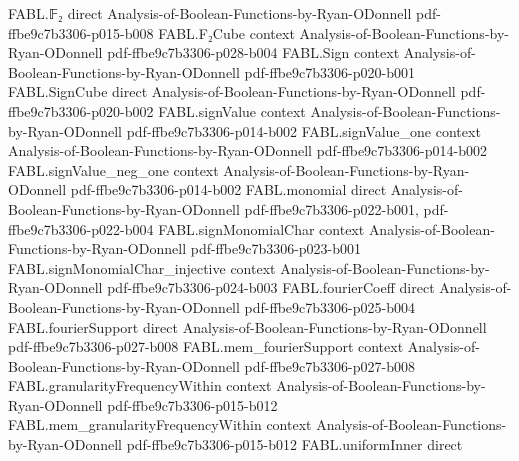 \begin{theorem}
\label{FABL.signBlrFunctionTester_complete}
\leanok
{}
\proofstep
  {FABL.𝔽₂}
  {direct}
  {Analysis-of-Boolean-Functions-by-Ryan-ODonnell}
  {pdf-ffbe9c7b3306-p015-b008}
\proofstep
  {FABL.F₂Cube}
  {context}
  {Analysis-of-Boolean-Functions-by-Ryan-ODonnell}
  {pdf-ffbe9c7b3306-p028-b004}
\proofstep
  {FABL.Sign}
  {context}
  {Analysis-of-Boolean-Functions-by-Ryan-ODonnell}
  {pdf-ffbe9c7b3306-p020-b001}
\proofstep
  {FABL.SignCube}
  {direct}
  {Analysis-of-Boolean-Functions-by-Ryan-ODonnell}
  {pdf-ffbe9c7b3306-p020-b002}
\proofstep
  {FABL.signValue}
  {context}
  {Analysis-of-Boolean-Functions-by-Ryan-ODonnell}
  {pdf-ffbe9c7b3306-p014-b002}
\proofstep
  {FABL.signValue_one}
  {context}
  {Analysis-of-Boolean-Functions-by-Ryan-ODonnell}
  {pdf-ffbe9c7b3306-p014-b002}
\proofstep
  {FABL.signValue_neg_one}
  {context}
  {Analysis-of-Boolean-Functions-by-Ryan-ODonnell}
  {pdf-ffbe9c7b3306-p014-b002}
\proofstep
  {FABL.monomial}
  {direct}
  {Analysis-of-Boolean-Functions-by-Ryan-ODonnell}
  {pdf-ffbe9c7b3306-p022-b001,
    pdf-ffbe9c7b3306-p022-b004}
\proofstep
  {FABL.signMonomialChar}
  {context}
  {Analysis-of-Boolean-Functions-by-Ryan-ODonnell}
  {pdf-ffbe9c7b3306-p023-b001}
\proofstep
  {FABL.signMonomialChar_injective}
  {context}
  {Analysis-of-Boolean-Functions-by-Ryan-ODonnell}
  {pdf-ffbe9c7b3306-p024-b003}
\proofstep
  {FABL.fourierCoeff}
  {direct}
  {Analysis-of-Boolean-Functions-by-Ryan-ODonnell}
  {pdf-ffbe9c7b3306-p025-b004}
\proofstep
  {FABL.fourierSupport}
  {direct}
  {Analysis-of-Boolean-Functions-by-Ryan-ODonnell}
  {pdf-ffbe9c7b3306-p027-b008}
\proofstep
  {FABL.mem_fourierSupport}
  {context}
  {Analysis-of-Boolean-Functions-by-Ryan-ODonnell}
  {pdf-ffbe9c7b3306-p027-b008}
\proofstep
  {FABL.granularityFrequencyWithin}
  {context}
  {Analysis-of-Boolean-Functions-by-Ryan-ODonnell}
  {pdf-ffbe9c7b3306-p015-b012}
\proofstep
  {FABL.mem_granularityFrequencyWithin}
  {context}
  {Analysis-of-Boolean-Functions-by-Ryan-ODonnell}
  {pdf-ffbe9c7b3306-p015-b012}
\proofstep
  {FABL.uniformInner}
  {direct}

\end{theorem}
